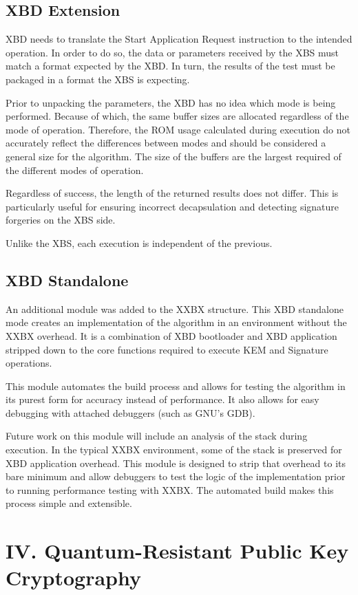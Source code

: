 \documentclass[10pt]{article}
\begin{document}
\subsection{XBD Extension}
XBD needs to translate the Start Application Request instruction to the intended operation. 
In order to do so, the data or parameters received by the XBS must match a format expected 
by the XBD. In turn, the results of the test must be packaged in a format the XBS is expecting.

Prior to unpacking the parameters, the XBD has no idea which mode is being performed. 
Because of which, the same buffer sizes are allocated regardless of the mode of operation. 
Therefore, the ROM usage calculated during execution do not accurately reflect the differences 
between modes and should be considered a general size for the algorithm. 
The size of the buffers are the largest required of the different modes of operation.

Regardless of success, the length of the returned results does not differ. 
This is particularly useful for ensuring incorrect decapsulation and detecting signature 
forgeries on the XBS side.

Unlike the XBS, each execution is independent of the previous.


\subsection{XBD Standalone}
An additional module was added to the XXBX structure. This XBD standalone mode creates 
an implementation of the algorithm in an environment without the XXBX overhead. It is a 
combination of XBD bootloader and XBD application stripped down to the core functions 
required to execute KEM and Signature operations.

This module automates the build process and allows for testing the algorithm in its purest 
form for accuracy instead of performance. It also allows for easy debugging with attached 
debuggers (such as GNU’s GDB).

Future work on this module will include an analysis of the stack during execution. 
In the typical XXBX environment, some of the stack is preserved for XBD application overhead. 
This module is designed to strip that overhead to its bare minimum and allow debuggers to 
test the logic of the implementation prior to running performance testing with XXBX. 
The automated build makes this process simple and extensible.


\section{IV. Quantum-Resistant Public Key Cryptography}
\end{document}
